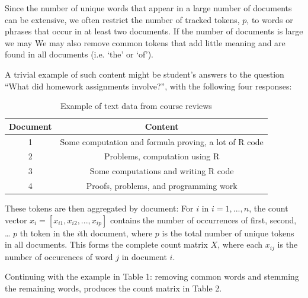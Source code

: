 \documentclass[12pt]{article}
\begin{document}
Since the number of unique words that appear in a large number of
documents can be extensive, we often restrict the number of tracked
tokens, $p$, to words or phrases that occur in at least two documents. If the number of documents is large we may  We may also
remove common tokens that add little meaning and are found in all
documents (i.e. `the' or `of').

A trivial example of such content might be student's answers to the
question ``What did homework assignments involve?'', with the following four responses:

\begin{table}[!hbpt]
\caption{Example of text data from course reviews} \label{tab:title}
\begin{center}
\begin{tabular} {c c}
\textbf{Document} & \textbf{Content} \\
\hline
1 & Some computation and formula proving, a lot of R code \\
2 & Problems, computation using R \\
3 & Some computations and writing R code\\
4 & Proofs, problems, and programming work \\
\end{tabular}
\end{center}
\end{table}

These tokens are then aggregated by document: For $i$ in $i = 1,...,n$,
the count vector $x_i = [x_{i1}, x_{i2}, ... , x_{ip}]$ contains the
number of occurrences of first, second, \ldots{} $p$ th token in the
$i$th document, where $p$ is the total number of unique tokens in all
documents. This forms the complete count matrix $X$, where each $x_{ij}$
is the number of occurences of word $j$ in document $i$.


Continuing with the example in Table 1: removing common words and stemming the remaining words, produces the count matrix in Table 2. 

\begin{table}[!hbpt]
\caption{Creating a word-count matrix from text}
\begin{center}
\end{center}
\end{table} 
\end{document}
